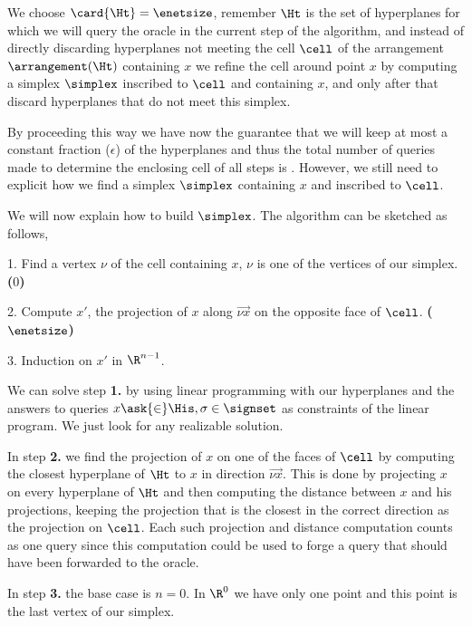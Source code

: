 We choose $\card{\Ht} = \enetsize$,
remember $\Ht$ is the set of hyperplanes for which we will query the oracle in
the current step of the algorithm, and instead of directly discarding
hyperplanes not meeting the cell $\cell$ of the arrangement $\arrangement(\Ht)$
containing $x$ we
refine the cell around point $x$ by computing a simplex $\simplex$ inscribed
to $\cell$ and containing $x$, and only after that discard hyperplanes that do
not meet this simplex.

By proceeding this way we have now the guarantee that we will keep at most a
constant fraction ($\epsilon$) of the hyperplanes and thus the total number of
queries made to determine the enclosing cell of
all steps is . However, we
still need to explicit how we find a simplex $\simplex$ containing $x$ and
inscribed to $\cell$.

We will now explain how to build $\simplex$. The algorithm can be sketched as
follows,

\begin{algorithm}
\item[1.] Find a vertex $\nu$ of the cell containing $x$, $\nu$ is one of
the vertices of our simplex. \textbf{($0$)}
\item[2.] Compute $x'$, the projection of $x$ along $\vec{\nu x}$ on the
opposite face of $\cell$. \textbf{($\enetsize$)}
\item[3.] Induction on $x'$ in $\R^{n-1}$.
\end{algorithm}

We can solve step \textbf{1.} by using linear programming with our
 hyperplanes and the
answers to queries $x \ask{\in} \His, \sigma \in \signset$ as
constraints of the linear program. We just look for any realizable solution.

In step \textbf{2.} we find the projection of $x$ on one of the faces of
$\cell$ by computing the closest hyperplane of $\Ht$ to $x$ in direction
$\vec{\nu x}$. This is done by projecting $x$ on every hyperplane of $\Ht$ and
then computing the distance between $x$ and his projections, keeping the
projection that is the closest in the correct direction as the projection
on $\cell$. Each such projection and distance computation counts as one query
since this computation could be used to forge a query that should have been
forwarded to the oracle.

In step \textbf{3.} the base case is $n = 0$. In $\R^0$ we have only one point
and this point is the last vertex of our simplex.

